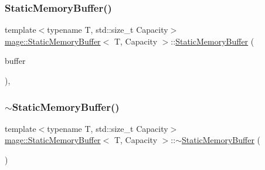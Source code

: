 \mbox{\label{classmage_1_1_static_memory_buffer_ad21c24f87cffd099b9f0fc9325747624}} 
\subsubsection{\texorpdfstring{Static\+Memory\+Buffer()}{StaticMemoryBuffer()}\hspace{0.1cm}{\footnotesize\ttfamily [3/3]}}
{\footnotesize\ttfamily template$<$typename T, std\+::size\+\_\+t Capacity$>$ \\
\mbox{\hyperlink{classmage_1_1_static_memory_buffer}{mage\+::\+Static\+Memory\+Buffer}}$<$ T, Capacity $>$\+::\mbox{\hyperlink{classmage_1_1_static_memory_buffer}{Static\+Memory\+Buffer}} (\begin{DoxyParamCaption}\item[{\mbox{\hyperlink{classmage_1_1_static_memory_buffer}{Static\+Memory\+Buffer}}$<$ T, Capacity $>$ \&\&}]{buffer }\end{DoxyParamCaption})\hspace{0.3cm}{\ttfamily [default]}, {\ttfamily [noexcept]}}

\mbox{\label{classmage_1_1_static_memory_buffer_abcb2394fef59fbe220494cf178df4622}} 
\subsubsection{\texorpdfstring{$\sim$\+Static\+Memory\+Buffer()}{~StaticMemoryBuffer()}}
{\footnotesize\ttfamily template$<$typename T, std\+::size\+\_\+t Capacity$>$ \\
\mbox{\hyperlink{classmage_1_1_static_memory_buffer}{mage\+::\+Static\+Memory\+Buffer}}$<$ T, Capacity $>$\+::$\sim$\mbox{\hyperlink{classmage_1_1_static_memory_buffer}{Static\+Memory\+Buffer}} (\begin{DoxyParamCaption}{ }\end{DoxyParamCaption})\hspace{0.3cm}{\ttfamily [default]}}



